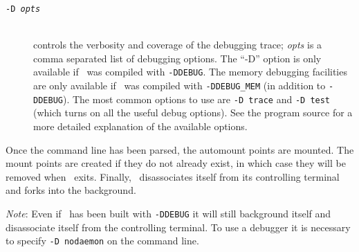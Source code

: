 \begin{description}
\item[\tt -D {\em opts}]\mbox{}\\
controls the verbosity and coverage of the debugging trace;
{\em opts} is a comma separated list of debugging options.
The ``-D'' option is only available if \amd\ was compiled with {\tt -DDEBUG}.
The memory debugging facilities are
only available if \amd\ was compiled with {\tt -DDEBUG\_MEM}
(in addition to {\tt -DDEBUG}).
The most common options to use are {\tt -D~trace} and {\tt -D~test}
(which turns on all the useful debug options).
See the program source for a more detailed explanation of the available options.

\end{description}

Once the command line has been parsed, the automount points are mounted.
The mount points are created if they do not already exist, in which case they
will be removed when \amd\ exits.
Finally, \amd\ disassociates itself from its controlling terminal and
forks into the background.

{\em Note\/}: Even if \amd\ has been built with {\tt -DDEBUG} it
will still background itself and disassociate itself from the controlling terminal.
To use a debugger it is necessary to
specify {\tt -D~nodaemon} on the command line.
